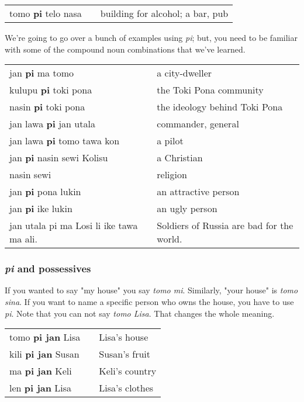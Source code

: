 \begin{supertabular}{p{5,5cm}|ll}
tomo \textbf{pi} telo nasa && building for alcohol; a bar, pub \\
\end{supertabular}  

We're going to go over a bunch of examples using \textit{pi}; but, you need to be familiar with some of the compound noun combinations that we've learned. 

\begin{supertabular}{p{5,5cm}|ll}
jan \textbf{pi} ma tomo && a city-dweller \\
kulupu \textbf{pi} toki pona && the Toki Pona community \\
nasin \textbf{pi} toki pona && the ideology behind Toki Pona \\
jan lawa \textbf{pi} jan utala && commander, general \\
jan lawa \textbf{pi} tomo tawa kon && a pilot \\
jan \textbf{pi} nasin sewi Kolisu && a Christian \\
nasin sewi && religion \\
jan \textbf{pi} pona lukin && an attractive person \\
jan \textbf{pi} ike lukin && an ugly person \\
jan utala pi ma Losi li ike tawa ma ali. && Soldiers of Russia are bad for the world. \\
\end{supertabular}  
%
\subsubsection*{\textit{pi} and possessives} 
%
If you wanted to say "my house" you say \textit{tomo mi}. 
Similarly, "your house" is \textit{tomo sina}. 
If you want to name a specific person who owns the house, you have to use \textit{pi}. 
Note that you can not say \textit{tomo Lisa}. 
That changes the whole meaning. 

\begin{supertabular}{p{5,5cm}|ll}
tomo \textbf{pi jan} Lisa && Lisa's house \\
kili \textbf{pi jan} Susan && Susan's fruit \\
ma \textbf{pi jan} Keli && Keli's country \\
len \textbf{pi jan} Lisa && Lisa's clothes \\
\end{supertabular}  

